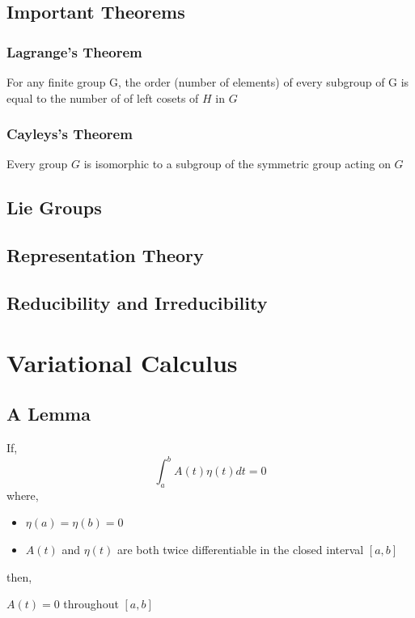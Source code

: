 \subsection{Important Theorems}
\subsubsection{Lagrange's Theorem}
\begin{tcolorbox}
    For any finite group G, the order (number of elements) of every subgroup of G is  equal to the number of of left cosets of $H$ in $G$
\end{tcolorbox}
\subsubsection{Cayleys's Theorem}
\begin{tcolorbox}
    Every group $G$ is isomorphic to a subgroup of the symmetric group acting on $G$
\end{tcolorbox}

\subsection{Lie Groups}

\subsection{Representation Theory}

\subsection{Reducibility and Irreducibility}

\section{Variational Calculus}
\subsection{A Lemma}
If,
\begin{equation}
    \int_{a}^{b}A(t)\eta(t)dt =0
\end{equation}
where,
\begin{itemize}
    \item $\eta(a) = \eta(b) = 0$
    \item $A(t)$ and $\eta(t)$ are both twice differentiable in the closed interval $[a,b]$ 
\end{itemize}
then,
\begin{tcolorbox}
$A(t) = 0$ throughout $[a,b]$
\end{tcolorbox}

